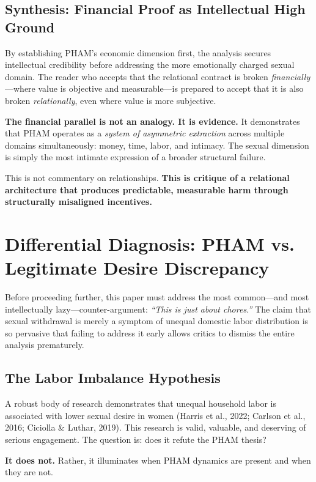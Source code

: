 \documentclass[12pt,openany]{book}
\numberwithin{equation}{chapter}
\begin{document}
\subsection{Synthesis: Financial Proof as Intellectual High Ground}

By establishing PHAM's economic dimension first, the analysis secures intellectual credibility before addressing the more emotionally charged sexual domain. The reader who accepts that the relational contract is broken \textit{financially}---where value is objective and measurable---is prepared to accept that it is also broken \textit{relationally}, even where value is more subjective.

\textbf{The financial parallel is not an analogy. It is evidence.} It demonstrates that PHAM operates as a \textit{system of asymmetric extraction} across multiple domains simultaneously: money, time, labor, and intimacy. The sexual dimension is simply the most intimate expression of a broader structural failure.

This is not commentary on relationships. \textbf{This is critique of a relational architecture that produces predictable, measurable harm through structurally misaligned incentives.}

\section{Differential Diagnosis: PHAM vs. Legitimate Desire Discrepancy}

Before proceeding further, this paper must address the most common---and most intellectually lazy---counter-argument: \textit{``This is just about chores.''} The claim that sexual withdrawal is merely a symptom of unequal domestic labor distribution is so pervasive that failing to address it early allows critics to dismiss the entire analysis prematurely.

\subsection{The Labor Imbalance Hypothesis}

A robust body of research demonstrates that unequal household labor is associated with lower sexual desire in women (Harris et al., 2022; Carlson et al., 2016; Ciciolla \& Luthar, 2019). This research is valid, valuable, and deserving of serious engagement. The question is: does it refute the PHAM thesis?

\textbf{It does not.} Rather, it illuminates when PHAM dynamics are present and when they are not.
\end{document}
